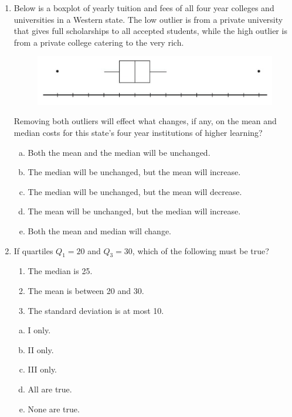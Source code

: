 \documentclass[a4paper,12pt,twoside]{book}
\begin{document}
\begin{itemize}
\begin{enumerate}
      \item Below is a boxplot of yearly tuition and fees of all four year colleges and universities in a Western state. The low outlier is from a private university that gives full scholarships to all accepted students, while the high outlier is from a private college catering to the very rich.
      \begin{figure}[H]
      \centering
       \includegraphics[scale=0.3]{figure10}
      \end{figure}
      Removing both outliers will effect what changes, if any, on the mean and median costs for this state’s four year institutions of higher learning?
      \begin{enumerate}[(a)]
        \item Both the mean and the median will be unchanged.
        \item The median will be unchanged, but the mean will increase.
        \item The median will be unchanged, but the mean will decrease.
        \item The mean will be unchanged, but the median will increase.
        \item Both the mean and median will change.
      \end{enumerate}
      \vspace{0.3cm}
   
   \item If quartiles $Q_1 = 20$ and $Q_3 = 30$, which of the following must be true?   
     \begin{enumerate}[\Roman*. , start =1]
     \item The median is 25.
     \item The mean is between 20 and 30.
     \item The standard deviation is at most 10.     
     \end{enumerate}
     
     \begin{enumerate}[(a)]
       \item I only.
       \item II only.
       \item III only.
       \item All are true.
       \item None are true.
     \end{enumerate}
      \vspace{0.3cm}
      

\end{enumerate}
\end{itemize}
\end{document}
